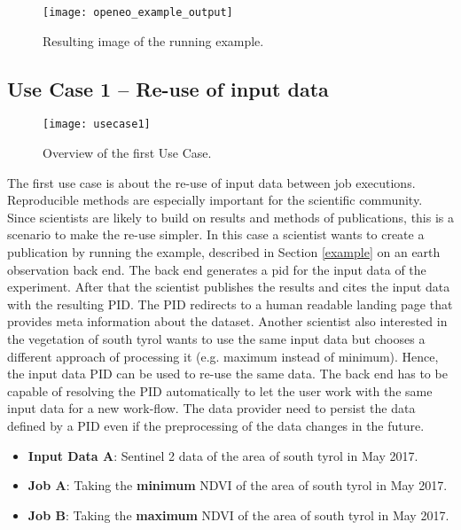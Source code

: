 \documentclass[draft,final]{vutinfth} %
\begin{document}
\begin{figure}[h]
	\centering
	\texttt{[image: openeo\_example\_output]}
	\caption{Resulting image of the running example.}
	\label{fig:example} %
\end{figure}


\subsection{Use Case 1 – Re-use of input data}\label{UseCase1}
\begin{figure}[h]
	\centering
	\texttt{[image: usecase1]}
	\caption{Overview of the first Use Case.}
	\label{fig:usecase1} %
\end{figure}
The first use case is about the re-use of input data between job executions. Reproducible methods are especially important for the scientific community. Since scientists are likely to build on results and methods of publications, this is a scenario to make the re-use simpler. In this case a scientist wants to create a publication by running the example, described in Section \ref{example} on an earth observation back end. The back end generates a \gls{pid} for the input data of the experiment. After that the scientist publishes the results and cites the input data with the resulting PID. The PID redirects to a human readable landing page that provides meta information about the dataset. Another scientist also interested in the vegetation of south tyrol wants to use the same input data but chooses a different approach of processing it (e.g. maximum instead of minimum). Hence, the input data PID can be used to re-use the same data. The back end has to be capable of resolving the PID automatically to let the user work with the same input data for a new work-flow. The data provider need to persist the data defined by a PID even if the preprocessing of the data changes in the future.    

\begin{itemize}
	\item \textbf{Input Data A}: Sentinel 2 data of the area of south tyrol in May 2017. 
	\item \textbf{Job A}: Taking the \textbf{minimum} NDVI of the area of south tyrol in May 2017. 
	\item \textbf{Job B}: Taking the \textbf{maximum} NDVI of the area of south tyrol in May 2017.
\end{itemize}
\end{document}
